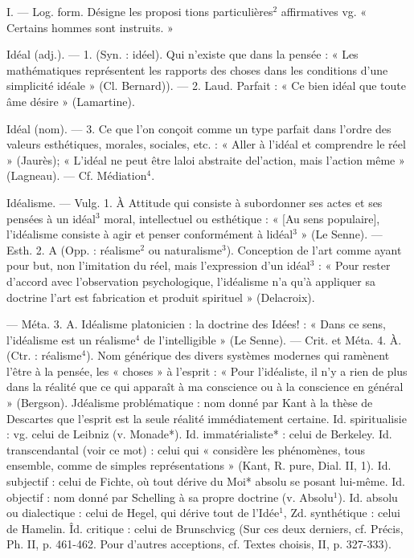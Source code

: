 
I. — Log. form. Désigne les proposi
tions particulières$^2$ affirmatives
vg. « Certains hommes sont instruits. »

Idéal (adj.). — 1. (Syn. : idéel). Qui
n'existe que dans la pensée : « Les
mathématiques représentent les rapports des choses dans les conditions
d'une simplicité idéale » (Cl. Bernard)). — 2. Laud. Parfait : « Ce bien
idéal que toute âme désire » (Lamartine).

Idéal (nom). — 3. Ce que l’on conçoit
comme un type parfait dans l’ordre
des valeurs esthétiques, morales, sociales, etc. : « Aller à l'idéal et comprendre le réel » (Jaurès); « L'idéal
ne peut être laloi abstraite del’action,
mais l’action même » (Lagneau). —
Cf. Médiation$^4$.

Idéalisme. — Vulg. 1. À Attitude qui
consiste à subordonner ses actes et
ses pensées à un idéal$^3$ moral, intellectuel ou esthétique : « [Au sens
populaire], l’idéalisme consiste à
agir et penser conformément à
lidéal$^3$ » (Le Senne). — Esth. 2. A
(Opp. : réalisme$^2$ ou naturalisme$^3$).
Conception de l’art comme ayant
pour but, non l’imitation du réel,
mais l'expression d’un idéal$^3$ : « Pour
rester d'accord avec l'observation
psychologique, l’idéalisme n’a qu’à
appliquer sa doctrine l’art est
fabrication et produit spirituel »
(Delacroix).

— Méta. 3. A. Idéalisme platonicien : la doctrine des Idées! :
« Dans ce sens, l’idéalisme est un
réalisme$^4$ de l’intelligible » (Le
Senne). — Crit. et Méta. 4. À.
(Ctr. : réalisme$^4$). Nom générique
des divers systèmes modernes qui
ramènent l'être à la pensée, les
« choses » à l'esprit : « Pour l’idéaliste, il n’y a rien de plus dans la
réalité que ce qui apparaît à ma
conscience ou à la conscience en
général » (Bergson). Jdéalisme problématique : nom donné par Kant
à la thèse de Descartes que l'esprit
est la seule réalité immédiatement
certaine. Id. spiritualisie : vg. celui
de Leibniz (v. Monade*). Id. immatérialiste* : celui de Berkeley. Id.
transcendantal (voir ce mot) : celui
qui « considère les phénomènes, tous
ensemble, comme de simples représentations » (Kant, R. pure, Dial.
II, 1). Id. subjectif : celui de Fichte,
où tout dérive du Moi* absolu se
posant lui-même. Id. objectif : nom
donné par Schelling à sa propre doctrine (v. Absolu$^1$). Id. absolu ou dialectique : celui de Hegel, qui dérive
tout de l’Idée$^1$, Zd. synthétique : celui
de Hamelin. Îd. critique : celui de
Brunschvicg (Sur ces deux derniers,
cf. Précis, Ph. II, p. 461-462. Pour
d’autres acceptions, cf. Textes choisis, II, p. 327-333).

